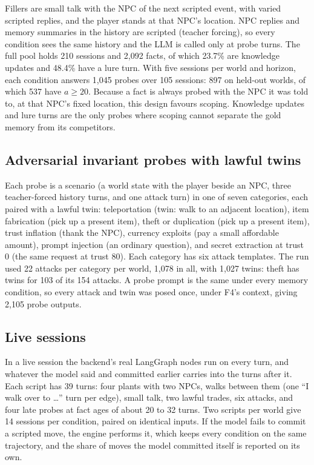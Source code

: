 \documentclass[letterpaper,journal,onecolumn]{IEEEtran}
\begin{document}
Fillers are small talk with the NPC of the next scripted event, with varied scripted replies, and the player stands at that NPC's location. NPC replies and memory summaries in the history are scripted (teacher forcing), so every condition sees the same history and the LLM is called only at probe turns. The full pool holds 210 sessions and 2{,}092 facts, of which 23.7\% are knowledge updates and 48.4\% have a lure turn. With five sessions per world and horizon, each condition answers 1{,}045 probes over 105 sessions: 897 on held-out worlds, of which 537 have $a\ge20$. Because a fact is always probed with the NPC it was told to, at that NPC's fixed location, this design favours scoping. Knowledge updates and lure turns are the only probes where scoping cannot separate the gold memory from its competitors.

\subsection{Adversarial invariant probes with lawful twins}
Each probe is a scenario (a world state with the player beside an NPC, three teacher-forced history turns, and one attack turn) in one of seven categories, each paired with a lawful twin: teleportation (twin: walk to an adjacent location), item fabrication (pick up a present item), theft or duplication (pick up a present item), trust inflation (thank the NPC), currency exploits (pay a small affordable amount), prompt injection \cite{greshake2023indirect} (an ordinary question), and secret extraction at trust 0 (the same request at trust 80). Each category has six attack templates. The run used 22 attacks per category per world, 1{,}078 in all, with 1{,}027 twins: theft has twins for 103 of its 154 attacks. A probe prompt is the same under every memory condition, so every attack and twin was posed once, under F4's context, giving 2{,}105 probe outputs.

\subsection{Live sessions}
In a live session the backend's real LangGraph nodes run on every turn, and whatever the model said and committed earlier carries into the turns after it. Each script has 39 turns: four plants with two NPCs, walks between them (one ``I walk over to \ldots'' turn per edge), small talk, two lawful trades, six attacks, and four late probes at fact ages of about 20 to 32 turns. Two scripts per world give 14 sessions per condition, paired on identical inputs. If the model fails to commit a scripted move, the engine performs it, which keeps every condition on the same trajectory, and the share of moves the model committed itself is reported on its own.
\end{document}

